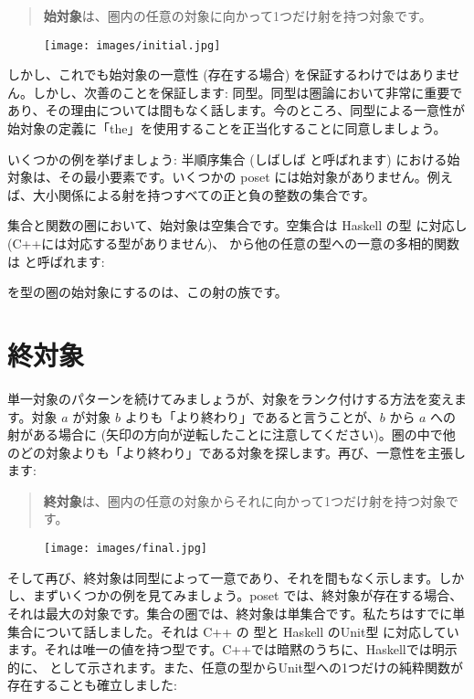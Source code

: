 \begin{quote}
  \textbf{始対象}は、圏内の任意の対象に向かって1つだけ射を持つ対象です。
\end{quote}

\begin{figure}[H]
  \centering
  \texttt{[image: images/initial.jpg]}
\end{figure}

\noindent
しかし、これでも始対象の一意性 (存在する場合) を保証するわけではありません。しかし、次善のことを保証します: 同型。同型は圏論において非常に重要であり、その理由については間もなく話します。今のところ、同型による一意性が始対象の定義に「the」を使用することを正当化することに同意しましょう。

いくつかの例を挙げましょう: 半順序集合 (しばしば  と呼ばれます) における始対象は、その最小要素です。いくつかの poset には始対象がありません。例えば、大小関係による射を持つすべての正と負の整数の集合です。

集合と関数の圏において、始対象は空集合です。空集合は Haskell の型  に対応し (C++には対応する型がありません)、 から他の任意の型への一意の多相的関数は  と呼ばれます:

 を型の圏の始対象にするのは、この射の族です。

\section{終対象}

単一対象のパターンを続けてみましょうが、対象をランク付けする方法を変えます。対象 $a$ が対象 $b$ よりも「より終わり」であると言うことが、$b$ から $a$ への射がある場合に (矢印の方向が逆転したことに注意してください)。圏の中で他のどの対象よりも「より終わり」である対象を探します。再び、一意性を主張します:

\begin{quote}
  \textbf{終対象}は、圏内の任意の対象からそれに向かって1つだけ射を持つ対象です。
\end{quote}

\begin{figure}[H]
  \centering
  \texttt{[image: images/final.jpg]}
\end{figure}

\noindent
そして再び、終対象は同型によって一意であり、それを間もなく示します。しかし、まずいくつかの例を見てみましょう。poset では、終対象が存在する場合、それは最大の対象です。集合の圏では、終対象は単集合です。私たちはすでに単集合について話しました。それは C++ の  型と Haskell のUnit型 \code{()} に対応しています。それは唯一の値を持つ型です。C++では暗黙のうちに、Haskellでは明示的に、\code{()} として示されます。また、任意の型からUnit型への1つだけの純粋関数が存在することも確立しました:

